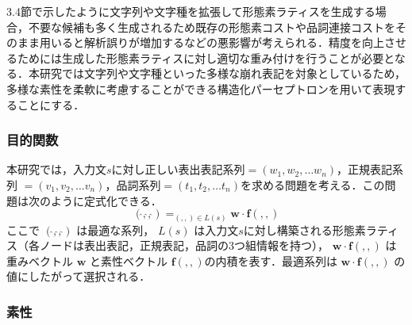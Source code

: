 \documentclass[japanese]{jnlp_1.4}
\newcommand{\argmax}{}
\def\vector#1{}
\begin{document}
3.4節で示したように文字列や文字種を拡張して形態素ラティスを生成する場合，不要な候補も多く生成されるため既存の形態素コストや品詞連接コストをそのまま用いると解析誤りが増加するなどの悪影響が考えられる．精度を向上させるためには生成した形態素ラティスに対し適切な重み付けを行うことが必要となる．本研究では文字列や文字種といった多様な崩れ表記を対象としているため，多様な素性を柔軟に考慮することができる構造化パーセプトロン\cite{Collins:2002}を用いて表現することにする．


\subsubsection{目的関数}

本研究では，入力文$s$に対し正しい表出表記系列$\vector{w}=(w_1, w_2, \ldots w_n)$，正規表記系列 $\vector{v}=(v_1, v_2, \ldots v_n)$，品詞系列$\vector{t}=(t_1, t_2, \ldots t_n)$を求める問題を考える．この問題は次のように定式化できる．
\begin{equation}
(\hat{\vector{w}}, \hat{\vector{v}}, \hat{\vector{t}})= \argmax_{(\vector{w}, \vector{v}, \vector{t}) \in L(s)} \mathbf{w} \cdot \mathbf{f}(\vector{w}, \vector{v}, \vector{t})
\end{equation}
ここで $(\hat{\vector{w}}, \hat{\vector{v}}, \hat{\vector{t}})$ は最適な系列， $L(s)$ は入力文$s$に対し構築される形態素ラティス（各ノードは表出表記，正規表記，品詞の3つ組情報を持つ）， $\mathbf{w} \cdot \mathbf{f}(\vector{w}, \vector{v}, \vector{t}) $ は重みベクトル $\mathbf{w}$ と素性ベクトル $\mathbf{f}(\vector{w}, \vector{v}, \vector{t}) $の内積を表す．最適系列は $\mathbf{w} \cdot \mathbf{f}(\vector{w}, \vector{v}, \vector{t}) $ の値にしたがって選択される．


\subsubsection{素性}
\end{document}
